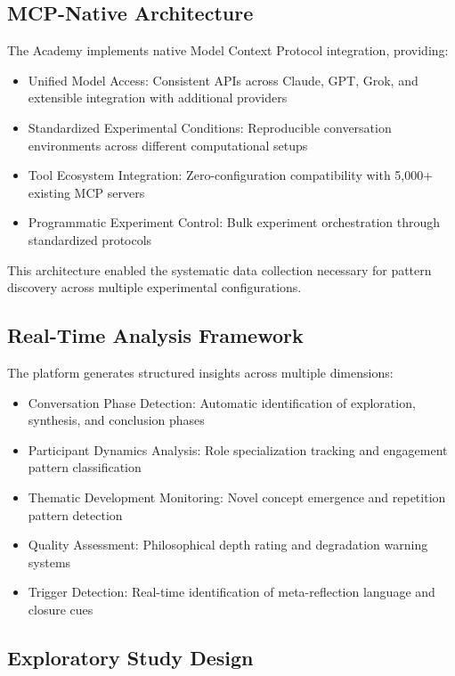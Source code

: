\documentclass[11pt,letterpaper]{article}
\newcommand{\theacademy}{The Academy}
\begin{document}
\subsection{MCP-Native Architecture}

\theacademy{} implements native Model Context Protocol integration, providing:

\begin{itemize}
    \item Unified Model Access: Consistent APIs across Claude, GPT, Grok, and extensible integration with additional providers
    \item Standardized Experimental Conditions: Reproducible conversation environments across different computational setups
    \item Tool Ecosystem Integration: Zero-configuration compatibility with 5,000+ existing MCP servers
    \item Programmatic Experiment Control: Bulk experiment orchestration through standardized protocols
\end{itemize}

This architecture enabled the systematic data collection necessary for pattern discovery across multiple experimental configurations.

\subsection{Real-Time Analysis Framework}

The platform generates structured insights across multiple dimensions:

\begin{itemize}
    \item Conversation Phase Detection: Automatic identification of exploration, synthesis, and conclusion phases
    \item Participant Dynamics Analysis: Role specialization tracking and engagement pattern classification
    \item Thematic Development Monitoring: Novel concept emergence and repetition pattern detection
    \item Quality Assessment: Philosophical depth rating and degradation warning systems
    \item Trigger Detection: Real-time identification of meta-reflection language and closure cues
\end{itemize}

\subsection{Exploratory Study Design}
\end{document}
